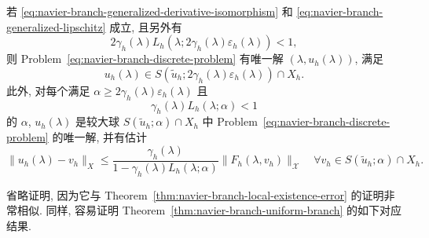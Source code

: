 \setcounter{statement}{5}
\begin{Theorem}\label{thm:navier-branch-generalized-local-existence}
若 \eqref{eq:navier-branch-generalized-derivative-isomorphism} 和
\eqref{eq:navier-branch-generalized-lipschitz} 成立, 且另外有
\begin{equation}\tag{3.19$'$}\label{eq:navier-branch-generalized-contraction}
2\gamma_h(\lambda)L_h
(\lambda;2\gamma_h(\lambda)\varepsilon_h(\lambda))<1,
\end{equation}
则 Problem~\eqref{eq:navier-branch-discrete-problem} 有唯一解
$(\lambda,u_h(\lambda))$, 满足
\begin{equation}\tag{3.20$'$}\label{eq:navier-branch-generalized-local-ball}
u_h(\lambda)\in
S(\widetilde u_h;2\gamma_h(\lambda)\varepsilon_h(\lambda))\cap X_h.
\end{equation}
此外, 对每个满足 $\alpha\geq2\gamma_h(\lambda)\varepsilon_h(\lambda)$ 且
\begin{equation}\tag{3.22$'$}\label{eq:navier-branch-generalized-uniqueness-radius}
\gamma_h(\lambda)L_h(\lambda;\alpha)<1
\end{equation}
的 $\alpha$, $u_h(\lambda)$ 是较大球
$S(\widetilde u_h;\alpha)\cap X_h$ 中
Problem~\eqref{eq:navier-branch-discrete-problem} 的唯一解, 并有估计
\begin{equation}\tag{3.23$'$}\label{eq:navier-branch-generalized-error}
\|u_h(\lambda)-v_h\|_X
\leq\frac{\gamma_h(\lambda)}
{1-\gamma_h(\lambda)L_h(\lambda;\alpha)}
\|F_h(\lambda,v_h)\|_{\mathscr X}
\quad\forall v_h\in S(\widetilde u_h;\alpha)\cap X_h.
\end{equation}
\end{Theorem}

省略证明, 因为它与 Theorem~\ref{thm:navier-branch-local-existence-error}
的证明非常相似. 同样, 容易证明 Theorem~\ref{thm:navier-branch-uniform-branch}
的如下对应结果.

